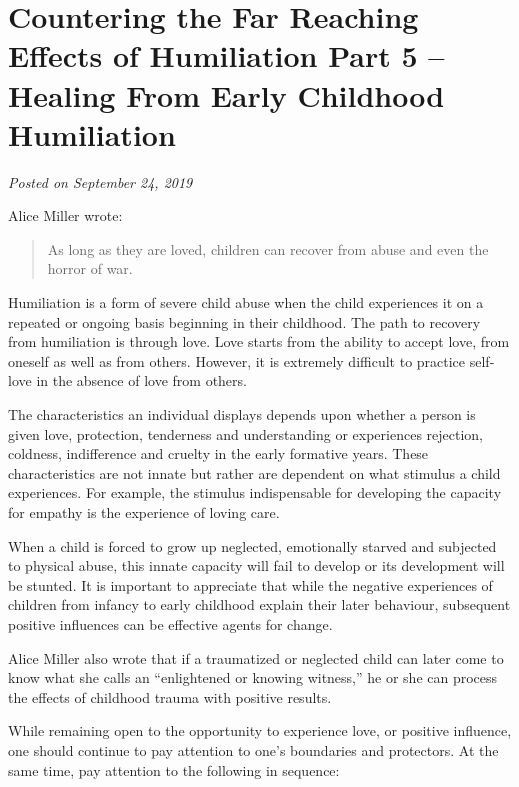 \documentclass[]{book}
\begin{document}
\hypertarget{countering-the-far-reaching-effects-of-humiliation-part-5-healing-from-early-childhood-humiliation}{%
\section{Countering the Far Reaching Effects of Humiliation Part 5 -- Healing From Early Childhood Humiliation}\label{countering-the-far-reaching-effects-of-humiliation-part-5-healing-from-early-childhood-humiliation}}

\emph{Posted on September 24, 2019}

Alice Miller wrote:

\begin{quote}
As long as they are loved, children can recover from abuse and even the horror of war.
\end{quote}

Humiliation is a form of severe child abuse when the child experiences it on a repeated or ongoing basis beginning in their childhood. The path to recovery from humiliation is through love. Love starts from the ability to accept love, from oneself as well as from others. However, it is extremely difficult to practice self-love in the absence of love from others.

The characteristics an individual displays depends upon whether a person is given love, protection, tenderness and understanding or experiences rejection, coldness, indifference and cruelty in the early formative years. These characteristics are not innate but rather are dependent on what stimulus a child experiences. For example, the stimulus indispensable for developing the capacity for empathy is the experience of loving care.

When a child is forced to grow up neglected, emotionally starved and subjected to physical abuse, this innate capacity will fail to develop or its development will be stunted. It is important to appreciate that while the negative experiences of children from infancy to early childhood explain their later behaviour, subsequent positive influences can be effective agents for change.

Alice Miller also wrote that if a traumatized or neglected child can later come to know what she calls an ``enlightened or knowing witness,'' he or she can process the effects of childhood trauma with positive results.

While remaining open to the opportunity to experience love, or positive influence, one should continue to pay attention to one's boundaries and protectors. At the same time, pay attention to the following in sequence:
\end{document}
